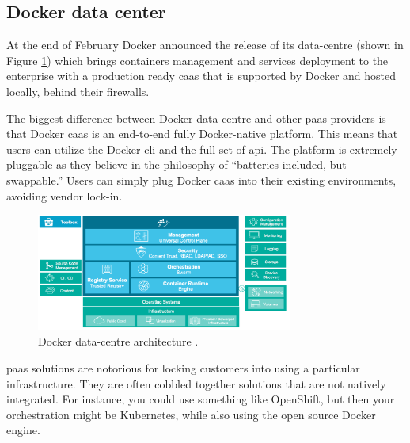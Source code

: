 \subsection*{Docker data center}
\label{sec:background-cloudPlatform-dockerDataCentre}
At the end of February Docker announced \cite{dockerDataCentrePresentation} the release of its data-centre
\cite{dockerDataCentre} (shown in Figure \ref{img:background-cloudPlatform-dockerDataCetre}) which
brings containers management and services deployment to the enterprise
with a production ready \ac{caas} that is supported by Docker and hosted locally, behind their firewalls.

The biggest difference between Docker data-centre and other \ac{paas} providers is that Docker \ac{caas}
is an end-to-end fully Docker-native platform. This means that users can utilize the Docker \ac{cli}
and the full set of \acs{api}. The platform is extremely pluggable as they believe in the philosophy of
``batteries included, but swappable.'' Users can simply plug Docker \ac{caas} into their existing
environments, avoiding vendor lock-in.

\begin{figure}
	\centering{}
	\includegraphics[width=0.75\textwidth]{chapters/background/images/docker-datacentre.png}
	\caption[Docker data-centre architecture]{Docker data-centre architecture \cite{dockerDataCentreArchitecture}.}
	\label{img:background-cloudPlatform-dockerDataCetre}
\end{figure}

\ac{paas} solutions are notorious for locking customers into using a particular infrastructure. They
are often cobbled together solutions that are not natively integrated. For instance, you could use
something like OpenShift, but then your orchestration might be Kubernetes, while also using the open
source Docker engine.
